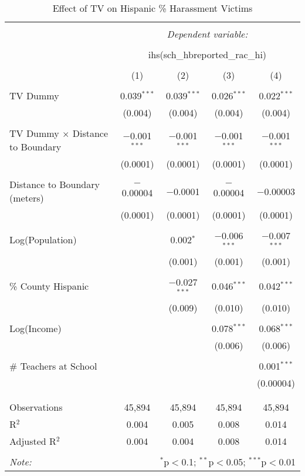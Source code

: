 
\begin{table}[!htbp] \centering 
  \caption{Effect of TV on Hispanic \% Harassment Victims} 
  \label{} 
\begin{tabular}{@{\extracolsep{-2pt}}lcccc} 
\\[-1.8ex]\hline 
\hline \\[-1.8ex] 
 & \multicolumn{4}{c}{\textit{Dependent variable:}} \\ 
\cline{2-5} 
\\[-1.8ex] & \multicolumn{4}{c}{ihs(sch\_hbreported\_rac\_hi)} \\ 
\\[-1.8ex] & (1) & (2) & (3) & (4)\\ 
\hline \\[-1.8ex] 
 TV Dummy & 0.039$^{***}$ & 0.039$^{***}$ & 0.026$^{***}$ & 0.022$^{***}$ \\ 
  & (0.004) & (0.004) & (0.004) & (0.004) \\ 
  & & & & \\ 
 TV Dummy $\times$ Distance to Boundary & $-$0.001$^{***}$ & $-$0.001$^{***}$ & $-$0.001$^{***}$ & $-$0.001$^{***}$ \\ 
  & (0.0001) & (0.0001) & (0.0001) & (0.0001) \\ 
  & & & & \\ 
 Distance to Boundary (meters) & $-$0.00004 & $-$0.0001 & $-$0.00004 & $-$0.00003 \\ 
  & (0.0001) & (0.0001) & (0.0001) & (0.0001) \\ 
  & & & & \\ 
 Log(Population) &  & 0.002$^{*}$ & $-$0.006$^{***}$ & $-$0.007$^{***}$ \\ 
  &  & (0.001) & (0.001) & (0.001) \\ 
  & & & & \\ 
 \% County Hispanic &  & $-$0.027$^{***}$ & 0.046$^{***}$ & 0.042$^{***}$ \\ 
  &  & (0.009) & (0.010) & (0.010) \\ 
  & & & & \\ 
 Log(Income) &  &  & 0.078$^{***}$ & 0.068$^{***}$ \\ 
  &  &  & (0.006) & (0.006) \\ 
  & & & & \\ 
 \# Teachers at School &  &  &  & 0.001$^{***}$ \\ 
  &  &  &  & (0.00004) \\ 
  & & & & \\ 
\hline \\[-1.8ex] 
Observations & 45,894 & 45,894 & 45,894 & 45,894 \\ 
R$^{2}$ & 0.004 & 0.005 & 0.008 & 0.014 \\ 
Adjusted R$^{2}$ & 0.004 & 0.004 & 0.008 & 0.014 \\ 
\hline 
\hline \\[-1.8ex] 
\textit{Note:}  & \multicolumn{4}{r}{$^{*}$p$<$0.1; $^{**}$p$<$0.05; $^{***}$p$<$0.01} \\ 
\end{tabular} 
\end{table} 
